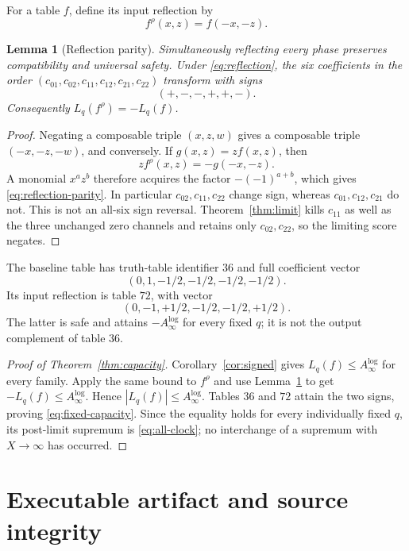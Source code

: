 \documentclass[11pt]{article}
\newtheorem{lemma}[theorem]{Lemma}
\theoremstyle{definition}
\theoremstyle{remark}
\newcommand{\Alog}{A_{\infty}^{\log}}
\begin{document}
For a table $f$, define its input reflection by
\begin{equation}
 f^\rho(x,z)=f(-x,-z).
 \label{eq:reflection}
\end{equation}

\begin{lemma}[Reflection parity]
\label{lem:reflection}
Simultaneously reflecting every phase preserves compatibility and universal
safety.  Under \eqref{eq:reflection}, the six coefficients in the order
$(c_{01},c_{02},c_{11},c_{12},c_{21},c_{22})$ transform with signs
\begin{equation}
 (+,-,-,+,+,-).
 \label{eq:reflection-parity}
\end{equation}
Consequently $L_q(f^\rho)=-L_q(f)$.
\end{lemma}

\begin{proof}
Negating a composable triple $(x,z,w)$ gives a composable triple
$(-x,-z,-w)$, and conversely.  If $g(x,z)=zf(x,z)$, then
\[
 zf^\rho(x,z)=-g(-x,-z).
\]
A monomial $x^az^b$ therefore acquires the factor
$-(-1)^{a+b}$, which gives \eqref{eq:reflection-parity}.  In particular
$c_{02},c_{11},c_{22}$ change sign, whereas
$c_{01},c_{12},c_{21}$ do not.  This is not an all-six sign reversal.
Theorem~\ref{thm:limit} kills $c_{11}$ as well as the three unchanged zero
channels and retains only $c_{02},c_{22}$, so the limiting score negates.
\end{proof}

The baseline table has truth-table identifier $36$ and full coefficient
vector
\[
 (0,1,-1/2,-1/2,-1/2,-1/2).
\]
Its input reflection is table $72$, with vector
\[
 (0,-1,+1/2,-1/2,-1/2,+1/2).
\]
The latter is safe and attains $-\Alog$ for every fixed $q$; it is not the
output complement of table $36$.

\begin{proof}[Proof of Theorem~\ref{thm:capacity}]
Corollary~\ref{cor:signed} gives $L_q(f)\le\Alog$ for every family.
Apply the same bound to $f^\rho$ and use Lemma~\ref{lem:reflection} to get
$-L_q(f)\le\Alog$.  Hence $|L_q(f)|\le\Alog$.  Tables $36$ and $72$ attain
the two signs, proving \eqref{eq:fixed-capacity}.  Since the equality holds
for every individually fixed $q$, its post-limit supremum is
\eqref{eq:all-clock}; no interchange of a supremum with $X\to\infty$ has
occurred.
\end{proof}

\section{Executable artifact and source integrity}
\end{document}
